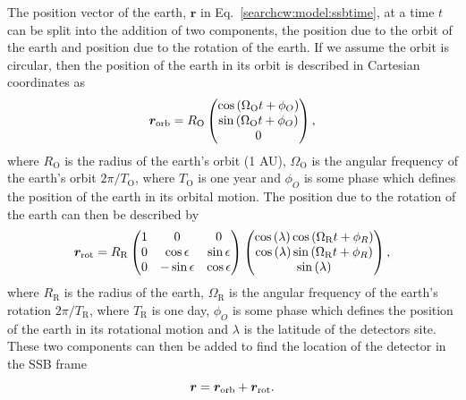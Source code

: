 The position vector of the earth, $\bm{r}$ in Eq.~\ref{searchcw:model:ssbtime}, at a time $t$ can be split into the addition of two components, the position due to the orbit of the earth and position due to the rotation of the earth.
If we assume the orbit is circular, then the position of the earth in its orbit is described in Cartesian coordinates as
\begin{equation}
    \bm{r}_{\rm{orb}} = R_{\mathrm{O}}
    \left(
    \begin{matrix}
        \cos{\left( \Omega_{\mathrm{O}} t + \phi_{O}  \right)}  \\
        \sin{\left( \Omega_{\mathrm{O}} t + \phi_{O}  \right)} \\
        0 \\
    \end{matrix} \right),
\end{equation}
where $R_{\mathrm{O}}$ is the radius of the earth's orbit (1 AU), $\Omega_{\mathrm{O}}$ is the angular frequency of the earth's orbit $2\pi/T_{\mathrm{O}}$, where $T_{\mathrm{O}}$ is one year and $\phi_{O}$ is some phase which defines the position of the earth in its orbital motion.
The position due to the rotation of the earth can then be described by 
\begin{equation}
    \bm{r}_{\rm{rot}} = R_{\mathrm{R}}
    \left(
    \begin{matrix}
        1 & 0 & 0  \\
        0 & \cos \epsilon & \sin \epsilon \\
        0 & -\sin \epsilon & \cos \epsilon \\
    \end{matrix} \right)
    \left(
    \begin{matrix}
        \cos{(\lambda)}\cos{\left( \Omega_{\mathrm{R}} t + \phi_{R}  \right)}  \\
        \cos{(\lambda)}\sin{\left( \Omega_{\mathrm{R}} t + \phi_{R}  \right)} \\
        \sin{(\lambda)} \\
    \end{matrix} \right),
\end{equation}
where $R_{\mathrm{R}}$ is the radius of the earth, $\Omega_{\mathrm{R}}$ is the angular frequency of the earth's rotation $2\pi/T_{\mathrm{R}}$, where $T_{\mathrm{R}}$ is one day, $\phi_{O}$ is some phase which defines the position of the earth in its rotational motion and $\lambda$ is the latitude of the detectors site.
These two components can then be added to find the location of the detector in the \gls{SSB} frame
\begin{equation}
    \bm{r} = \bm{r}_{\rm{orb}} + \bm{r}_{\rm{rot}}.
\end{equation}

